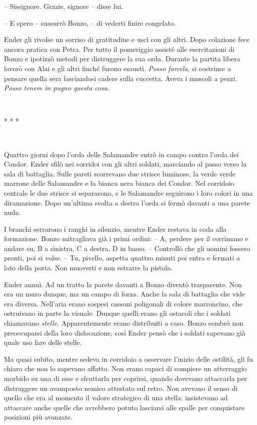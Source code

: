 {-- Sissignore. Grazie, signore -- disse lui.}

{-- E spero -- sussurrò Bonzo, -- di vederti finire congelato.}

{Ender gli rivolse un sorriso di gratitudine e uscì con gli altri. Dopo
	colazione fece ancora pratica con Petra. Per tutto il pomeriggio assisté
	alle esercitazioni di Bonzo e ipotizzò metodi per distruggere la sua
	orda. Durante la partita libera lavorò con Alai e gli altri finché
	furono esausti. \emph{Posso farcela}, \emph{} si costrinse a pensare
	quella sera lasciandosi cadere sulla cuccetta. Aveva i muscoli a pezzi.
	\emph{Posso tenere in pugno questa cosa.}}

{~}

\begin{center}
	{* * *}
\end{center}

{~}

{Quattro giorni dopo l'orda delle Salamandre entrò in campo contro
	l'orda dei Condor. Ender sfilò nei corridoi con gli altri soldati,
	marciando al passo verso la sala di battaglia. Sulle pareti scorrevano
	due strisce luminose, la verde verde marrone delle Salamandre e la
	bianca nera bianca dei Condor. Nel corridoio centrale le due strisce si
	separarono, e le Salamandre seguirono i loro colori in una diramazione.
	Dopo un'ultima svolta a destra l'orda si fermò davanti a una parete
	nuda.}

{I branchi serrarono i ranghi in silenzio, mentre Ender restava in coda
	alla formazione. Bonzo mitragliava già i primi ordini: -- A, perdere per
	il corrimano e andare su, B a sinistra, C a destra, D in basso. --
	Controllò che gli uomini fossero pronti, poi si volse. -- Tu, pivello,
	aspetta quattro minuti poi entra e fermati a lato della porta. Non
	muoverti e non estrarre la pistola.}

{Ender annuì. Ad un tratto la parete davanti a Bonzo diventò
	trasparente. Non era un muro dunque, ma un campo di forza. Anche la sala
	di battaglia che vide era diversa. Nell'aria erano sospesi cassoni
	poligonali di colore marroncino, che ostruivano in parte la visuale.
	Dunque quelli erano gli ostacoli che i soldati chiamavano \emph{stelle.}
	Apparentemente erano distribuiti a caso. Bonzo sembrò non preoccuparsi
	della loro dislocazione, così Ender pensò che i soldati sapevano già
	quale uso fare delle stelle.}

{Ma quasi subito, mentre sedeva in corridoio a osservare l'inizio delle
	ostilità, gli fu chiaro che non lo sapevano affatto. Non erano capaci di
	compiere un atterraggio morbido su una di esse e sfruttarla per
	coprirsi, quando dovevano attaccarla per distruggere un avamposto nemico
	attestato sul retro. Non avevano il senso di quello che era al momento
	il valore strategico di una stella: insistevano ad attaccare anche
	quelle che avrebbero potuto lasciarsi alle spalle per conquistare
	posizioni più avanzate.}

